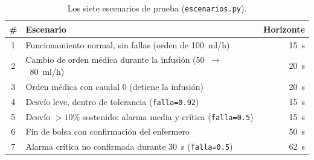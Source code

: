 \documentclass[11pt,a4paper]{article}
\begin{document}
\begin{table}[H]
\centering
\small
\renewcommand{\arraystretch}{1.15}
\begin{tabular}{c >{\raggedright\arraybackslash}p{10.5cm} r}
\toprule
\# & Escenario & Horizonte \\
\midrule
1 & Funcionamiento normal, sin fallas (orden de 100~ml/h) & 15~s \\
2 & Cambio de orden médica durante la infusión (50~$\to$~80~ml/h) & 20~s \\
3 & Orden médica con caudal 0 (detiene la infusión) & 20~s \\
4 & Desvío leve, dentro de tolerancia (\texttt{falla=0.92}) & 15~s \\
5 & Desvío $>10\%$ sostenido: alarma media y crítica (\texttt{falla=0.5}) & 15~s \\
6 & Fin de bolsa con confirmación del enfermero & 50~s \\
7 & Alarma crítica no confirmada durante 30~s (\texttt{falla=0.5}) & 62~s \\
\bottomrule
\end{tabular}
\caption{Los siete escenarios de prueba (\texttt{escenarios.py}).}
\label{tab:escenarios}
\end{table}
\end{document}
